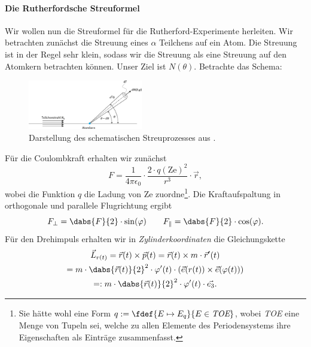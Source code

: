 \documentclass{subfiles}
\begin{document}
    \paragraph*{Die Rutherfordsche Streuformel}
        Wir wollen nun die Streuformel für die Rutherford-Experimente herleiten. Wir betrachten zunächst die Streuung eines $\alpha$ Teilchens auf ein Atom. Die Streuung ist in der Regel sehr klein, sodass wir die Streuung als eine Streuung auf den Atomkern betrachten können. Unser Ziel ist $N(\theta)$. Betrachte das Schema:
        \begin{figure}
            \centering
            \includegraphics[width=5cm]{Bilddateien/physiko.21.45_9783110445671-fig_001.jpg}
            \caption[short]{Darstellung des schematischen Streuprozesses aus \cite{degruyer:Streuung}.}
            \label{fig:Streuung}
        \end{figure}
        Für die Coulombkraft erhalten wir zunächst 
        \[F=\frac{1}{4\pi\epsilon_0}\cdot\frac{2\cdot q(\text{Ze})^2}{r^3}\cdot\vec{r},\]
        wobei die Funktion $q$ die Ladung von Ze zuordne\footnote{Sie hätte wohl eine Form $q:=\fdef{E\mapsto E_q}{E\in\emph{TOE}}$, wobei \emph{TOE} eine Menge von Tupeln sei, welche zu allen Elemente des Periodensystems ihre Eigenschaften als Einträge zusammenfasst.}. Die Kraftaufspaltung in orthogonale und parallele Flugrichtung ergibt
        \[F_\perp=\dabs{F}{2}\cdot\sin(\varphi)\qquad F_\parallel=\dabs{F}{2}\cdot\cos(\varphi).\]
        Für den Drehimpuls erhalten wir in \emph{Zylinderkoordinaten} die Gleichungskette
        \begin{multline*}
            \vec{L}_{r(t)}=\vec{r}(t)\times\vec{p}(t)=\vec{r}(t)\times m\cdot\vec{r}'(t)\\
            =m\cdot \dabs{\vec{r}(t)}{2}^2\cdot\varphi'(t)\cdot(\vec{e}(r(t))\times \vec{e}(\varphi(t)))\\
            =:m\cdot \dabs{\vec{r}(t)}{2}^2\cdot\varphi'(t)\cdot\vec{e_3}.
        \end{multline*} 
\end{document}
